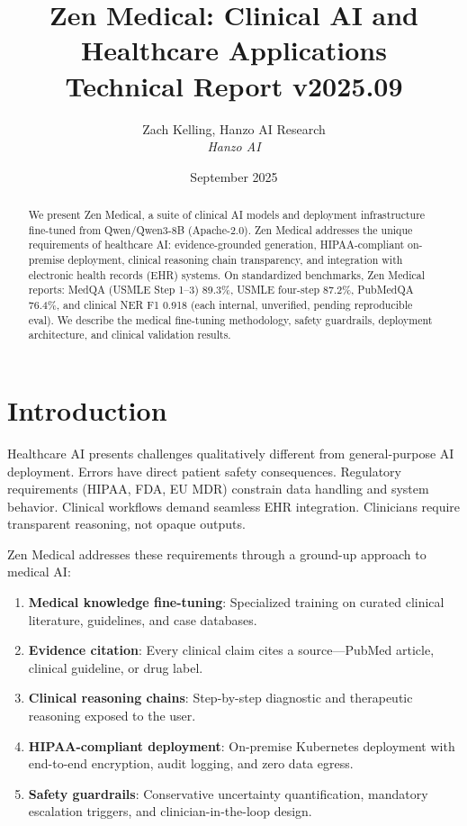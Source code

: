\documentclass[11pt,a4paper]{article}
\title{\textbf{Zen Medical: Clinical AI and Healthcare Applications}\\
\large Technical Report v2025.09}
\author{Zach Kelling, Hanzo AI Research\\
\textit{Hanzo AI}}
\date{September 2025}
\begin{document}
\maketitle

\begin{abstract}
We present Zen Medical, a suite of clinical AI models and deployment infrastructure fine-tuned from Qwen/Qwen3-8B (Apache-2.0). Zen Medical addresses the unique requirements of healthcare AI: evidence-grounded generation, HIPAA-compliant on-premise deployment, clinical reasoning chain transparency, and integration with electronic health records (EHR) systems. On standardized benchmarks, Zen Medical reports: MedQA (USMLE Step 1--3) 89.3\%, USMLE four-step 87.2\%, PubMedQA 76.4\%, and clinical NER F1 0.918 (each internal, unverified, pending reproducible eval). We describe the medical fine-tuning methodology, safety guardrails, deployment architecture, and clinical validation results.
\end{abstract}

\section{Introduction}

Healthcare AI presents challenges qualitatively different from general-purpose AI deployment. Errors have direct patient safety consequences. Regulatory requirements (HIPAA, FDA, EU MDR) constrain data handling and system behavior. Clinical workflows demand seamless EHR integration. Clinicians require transparent reasoning, not opaque outputs.

Zen Medical addresses these requirements through a ground-up approach to medical AI:

\begin{enumerate}
  \item \textbf{Medical knowledge fine-tuning}: Specialized training on curated clinical literature, guidelines, and case databases.
  \item \textbf{Evidence citation}: Every clinical claim cites a source—PubMed article, clinical guideline, or drug label.
  \item \textbf{Clinical reasoning chains}: Step-by-step diagnostic and therapeutic reasoning exposed to the user.
  \item \textbf{HIPAA-compliant deployment}: On-premise Kubernetes deployment with end-to-end encryption, audit logging, and zero data egress.
  \item \textbf{Safety guardrails}: Conservative uncertainty quantification, mandatory escalation triggers, and clinician-in-the-loop design.
\end{enumerate}
\end{document}
